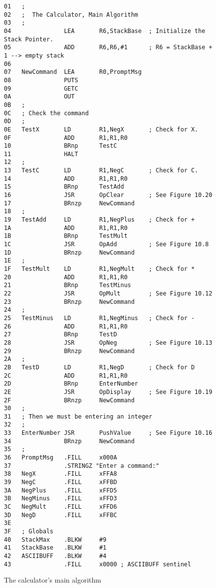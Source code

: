 \documentclass{patt}
\begin{document}
\FloatBarrier
\begin{figure}[h!]
\begin{minipage}{36pc}
\begin{Verbatim}[fontsize=\fontsize{9}{10}\selectfont]
01   ;
02   ;  The Calculator, Main Algorithm
03   ;
04               LEA       R6,StackBase  ; Initialize the Stack Pointer.
05               ADD       R6,R6,#1      ; R6 = StackBase + 1 --> empty stack
06   
07   NewCommand  LEA       R0,PromptMsg
08               PUTS
09               GETC
0A               OUT
0B   ;
0C   ; Check the command
0D   ;
0E   TestX       LD        R1,NegX       ; Check for X.
0F               ADD       R1,R1,R0
10               BRnp      TestC
11               HALT
12   ;
13   TestC       LD        R1,NegC       ; Check for C.
14               ADD       R1,R1,R0
15               BRnp      TestAdd
16               JSR       OpClear       ; See Figure 10.20
17               BRnzp     NewCommand
18   ;
19   TestAdd     LD        R1,NegPlus    ; Check for +
1A               ADD       R1,R1,R0
1B               BRnp      TestMult
1C               JSR       OpAdd         ; See Figure 10.8
1D               BRnzp     NewCommand
1E   ;
1F   TestMult    LD        R1,NegMult    ; Check for *
20               ADD       R1,R1,R0
21               BRnp      TestMinus
22               JSR       OpMult        ; See Figure 10.12
23               BRnzp     NewCommand
24   ;
25   TestMinus   LD        R1,NegMinus   ; Check for -
26               ADD       R1,R1,R0
27               BRnp      TestD
28               JSR       OpNeg         ; See Figure 10.13
29               BRnzp     NewCommand
2A   ;
2B   TestD       LD        R1,NegD       ; Check for D
2C               ADD       R1,R1,R0
2D               BRnp      EnterNumber
2E               JSR       OpDisplay     ; See Figure 10.19
2F               BRnzp     NewCommand
30   ;
31   ; Then we must be entering an integer
32   ;
33   EnterNumber JSR       PushValue     ; See Figure 10.16
34               BRnzp     NewCommand
35   ;
36   PromptMsg   .FILL     x000A
37               .STRINGZ "Enter a command:"
38   NegX        .FILL     xFFA8
39   NegC        .FILL     xFFBD
3A   NegPlus     .FILL     xFFD5
3B   NegMinus    .FILL     xFFD3
3C   NegMult     .FILL     xFFD6
3D   NegD        .FILL     xFFBC
3E   
3F   ; Globals
40   StackMax    .BLKW     #9
41   StackBase   .BLKW     #1
42   ASCIIBUFF   .BLKW     #4
43               .FILL     x0000 ; ASCIIBUFF sentinel 
\end{Verbatim}
\caption{The calculator's main algorithm}
\label{fig:calculator.main.algorithm}
\end{minipage}
\end{figure}
\end{document}
